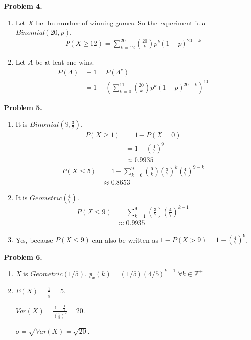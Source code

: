 \documentclass{article}
\begin{document}
\textbf{Problem 4.}
\begin{enumerate}[label={(\alph*)}]
    \item 
    Let $X$ be the number of winning games. So the experiment is a $Binomial(20, p)$.
    \begin{align}
        P(X \ge 12) = \sum_{k=12}^{20} {20 \choose k}p^k(1-p)^{20-k}
    \end{align}

    \item 
    Let $A$ be at leat one wins.
    \begin{align}
        P(A) & = 1-P(A^c) \\
        & = 1- \left(\sum_{k=0}^{11} {20 \choose k}p^k(1-p)^{20-k}\right)^{10} 
    \end{align}
\end{enumerate}
\pagebreak

\textbf{Problem 5.}
\begin{enumerate}[label={(\alph*)}]
    \item It is $Binomial(9, \frac{3}{7})$.
    \begin{align}
        P(X \ge 1) & = 1-P(X=0) \\
        & = 1- \left(\frac{4}{7}\right)^9 \\ 
        & \approx 0.9935 
    \end{align}
    \begin{align}
        P(X \le 5) & = 1 - \sum_{k=6}^{9}{9\choose k}\left(\frac{3}{7}\right)^k \left(\frac{4}{7}\right)^{9-k} \\
        & \approx 0.8653
    \end{align}

    \item It is $Geometric(\frac{4}{7})$.
    \begin{align}
        P(X \le 9) & = \sum_{k = 1}^{9}\left(\frac{3}{7}\right)\left(\frac{4}{7}\right)^{k-1} \\
        & \approx 0.9935 
    \end{align}

    \item 
    Yes, because $P(X \le 9)$ can also be written as $1 - P(X>9) = 1-\left(\frac{4}{7}\right)^9$.
\end{enumerate}
\bigbreak

\textbf{Problem 6.}
\begin{enumerate}[label={(\alph*)}]
    \item $X$ is $Geometric(1/5)$.
    $p_x(k)=(1/5)(4/5)^{k-1} \; \forall k \in \mathbb{Z}^+$

    \item 
    $E(X)=\frac{1}{\frac{1}{5}}=5$.

    $Var(X)=\frac{1-\frac{1}{5}}{\left(\frac{1}{5}\right)^2}=20$.

    $\sigma=\sqrt{Var(X)}=\sqrt{20}$.
\end{enumerate}
\bigbreak
\end{document}
